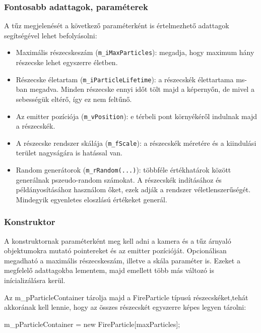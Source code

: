 \subsubsection{Fontosabb adattagok, paraméterek}
A tűz megjelenését a következő paraméterként is értelmezhető adattagok segítségével lehet befolyásolni:
\begin{itemize}
\item Maximális részecskeszám (\texttt{m\_iMaxParticles}): megadja, hogy maximum hány részecske lehet egyszerre életben.
\item Részecske életartam (\texttt{m\_iParticleLifetime}): a részecskék élettartama ms-ban megadva. Minden részecske ennyi időt tölt majd a képernyőn, de mivel a sebességük eltérő, így ez nem feltűnő.
\item Az emitter pozíciója (\texttt{m\_vPosition}): e térbeli pont környékéről indulnak majd a részecskék.
\item A részecske rendszer skálája (\texttt{m\_fScale}): a részecskék méretére és a kiindulási terület nagyságára is hatással van.
\item Random generátorok (\texttt{m\_rRandom(...)}): többféle értékhatárok között generálnak pszeudo-random számokat. A részecskék indításához és példányosításához használom őket, ezek adják a rendszer véletlenszerűségét. Mindegyik egyenletes eloszlású értékeket generál.
\end{itemize}

\subsubsection{Konstruktor}
A konstruktornak paraméterként meg kell adni a kamera és a tűz árnyaló objektumokra mutató pointereket és az emitter pozícióját. Opcionálisan megadható a maximális részecskeszám, illetve a skála paraméter is. Ezeket a megfelelő adattagokba lementem, majd emellett több más változó is inícializálásra kerül. 

Az m\_pParticleContainer tárolja majd a FireParticle típusú részecskéket,tehát akkorának kell lennie, hogy az összes részecskét egyszerre képes legyen tárolni:
\begin{cpp}
m_pParticleContainer = new FireParticle[maxParticles];
\end{cpp}

